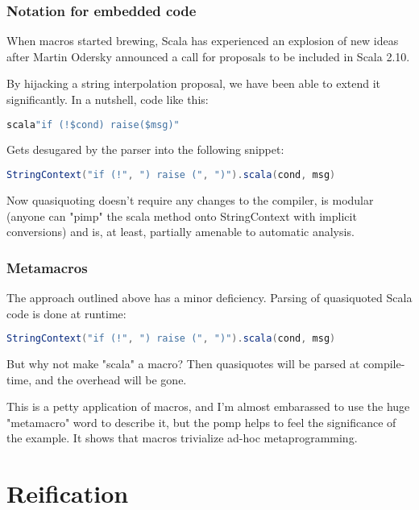 \documentclass[hyperref={bookmarks=false}]{beamer}
\begin{document}
\begin{frame}[fragile]
\frametitle{Notation for embedded code}

When macros started brewing, Scala has experienced an explosion of new ideas after Martin Odersky announced a call for proposals to be included in Scala 2.10.

By hijacking a string interpolation proposal, we have been able to extend it significantly. In a nutshell, code like this:

\begin{lstlisting}[language=scala]
scala"if (!$cond) raise($msg)"
\end{lstlisting}

Gets desugared by the parser into the following snippet:

\begin{lstlisting}[language=scala]
StringContext("if (!", ") raise (", ")").scala(cond, msg)
\end{lstlisting}

Now quasiquoting doesn't require any changes to the compiler, is modular (anyone can "pimp" the scala method onto StringContext with implicit conversions) and is, at least, partially amenable to automatic analysis.
\end{frame}

\begin{frame}[fragile]
\frametitle{Metamacros}

The approach outlined above has a minor deficiency. Parsing of quasiquoted Scala code is done at runtime:

\begin{lstlisting}[language=scala]
StringContext("if (!", ") raise (", ")").scala(cond, msg)
\end{lstlisting}

But why not make "scala" a macro? Then quasiquotes will be parsed at compile-time, and the overhead will be gone.

This is a petty application of macros, and I'm almost embarassed to use the huge "metamacro" word to describe it, but the pomp helps to feel the significance of the example. It shows that macros trivialize ad-hoc metaprogramming.
\end{frame}

\section{Reification}
\end{document}
